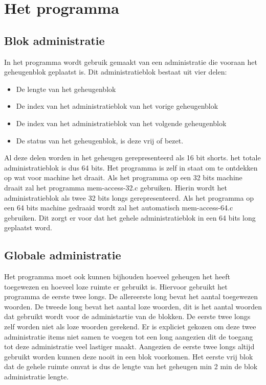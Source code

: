 \documentclass[11pt]{article}
\begin{document}
	\section{Het programma}\label{sec:programma}	
		\subsection{Blok administratie}\label{sec:programmablok}
			In het programma wordt gebruik gemaakt van een administratie die vooraan het geheugenblok geplaatst is. Dit administratieblok bestaat uit vier delen:
			\begin{itemize}
				\item De lengte van het geheugenblok
				\item De index van het administratieblok van het vorige geheugenblok
				\item De index van het administratieblok van het volgende geheugenblok
				\item De status van het geheugenblok, is deze vrij of bezet.
			\end{itemize}
			Al deze delen worden in het geheugen gerepresenteerd als 16 bit shorts. het totale administratieblok is dus 64 bits.
			Het programma is zelf in staat om te ontdekken op wat voor machine het draait.
			Als het programma op een 32 bits machine draait zal het programma mem-access-32.c gebruiken.
			Hierin wordt het administratieblok als twee 32 bits longs gerepresenteerd.
			Als het programma op een 64 bits machine gedraaid wordt zal het automatisch mem-access-64.c gebruiken.
			Dit zorgt er voor dat het gehele administratieblok in een 64 bits long geplaatst word.
		
		\subsection{Globale administratie}\label{sec:programmaglobaal}
			Het programma moet ook kunnen bijhouden hoeveel geheugen het heeft toegewezen en hoeveel loze ruimte er gebruikt is.
			Hiervoor gebruikt het programma de eerste twee longs. De allereerste long bevat het aantal toegewezen woorden.
			De tweede long bevat het aantal loze woorden, dit is het aantal woorden dat gebruikt wordt voor de administartie van de blokken.
			De eerste twee longs zelf worden niet als loze woorden gerekend.
			Er is expliciet gekozen om deze twee administratie items niet samen te voegen tot een long aangezien dit de toegang tot deze administratie veel lastiger maakt.
			Aangezien de eerste twee longs altijd gebruikt worden kunnen deze nooit in een blok voorkomen.
			Het eerste vrij blok dat de gehele ruimte omvat is dus de lengte van het geheugen min 2 min de blok administratie lengte.
		
\end{document}
